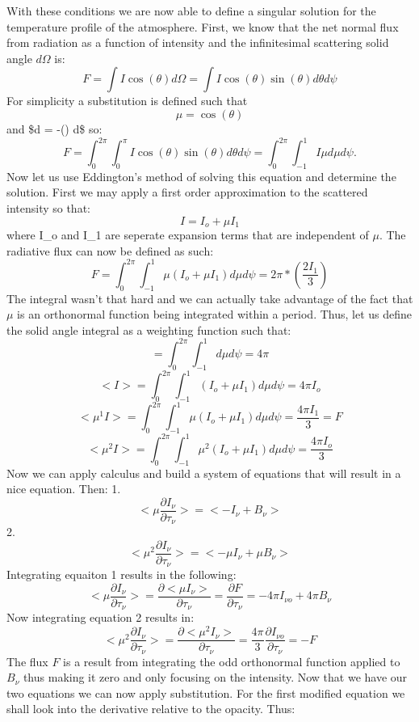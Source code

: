 \documentclass[11pt]{article}
\begin{document}
With these conditions we are now able to define a singular solution for
the temperature profile of the atmosphere. First, we know that the net
normal flux from radiation as a function of intensity and the
infinitesimal scattering solid angle \(d\Omega\) is:
\[F = \int I \cos(\theta) d\Omega= \int I \cos(\theta) \sin(\theta) d\theta d\psi\]
For simplicity a substitution is defined such that
\[\mu = \cos(\theta)\] and \$d \mu = -\sin(\theta) d\theta \$ so:
\[F = \int_{0}^{2\pi} \int_{0}^{\pi} I \cos(\theta) \sin(\theta) d\theta d\psi = \int_{0}^{2\pi} \int_{-1}^{1} I \mu d\mu d\psi.\]
Now let us use Eddington's method of solving this equation and determine
the solution. First we may apply a first order approximation to the
scattered intensity so that: \[I = I_o + \mu I_1\] where I\_o and I\_1
are seperate expansion terms that are independent of \(\mu\). The
radiative flux can now be defined as such:
\[F = \int_{0}^{2\pi} \int_{-1}^{1}  \mu(I_o + \mu I_1 )d\mu d\psi = 2 \pi * (\frac{2 I_1}{3})\]
The integral wasn't that hard and we can actually take advantage of the
fact that \(\mu\) is an orthonormal function being integrated within a
period. Thus, let us define the solid angle integral as a weighting
function such that:
\[<1> = \int_{0}^{2\pi} \int_{-1}^{1} d\mu d\psi = 4 \pi\]
\[<I> = \int_{0}^{2\pi} \int_{-1}^{1} (I_o + \mu I_1 )d\mu d\psi = 4 \pi I_o\]
\[<\mu^1 I> = \int_{0}^{2\pi} \int_{-1}^{1} \mu(I_o + \mu I_1 )d\mu d\psi = \frac{4 \pi I_1}{3}= F\]
\[<\mu^2 I> = \int_{0}^{2\pi} \int_{-1}^{1} \mu^2(I_o + \mu I_1 )d\mu d\psi = \frac{4 \pi I_o}{3}\]
Now we can apply calculus and build a system of equations that will
result in a nice equation. Then: 1.
\[<\mu \frac{\partial I_{\nu}}{\partial \tau_{\nu}}> = <- I_{\nu} + B_{\nu}>\]
2.
\[<\mu^2 \frac{\partial I_{\nu}}{\partial \tau_{\nu}}> = <- \mu I_{\nu} + \mu B_{\nu}>\]
Integrating equaiton 1 results in the following:
\[<\mu \frac{\partial I_{\nu}}{\partial \tau_{\nu}}> = \frac{\partial <\mu I_{\nu}>}{\partial \tau_{\nu}} = \frac{\partial F}{\partial \tau_{\nu}}  = - 4 \pi I_{\nu o} +4\pi B_{\nu}\]
Now integrating equation 2 results in:
\[<\mu^2 \frac{\partial I_{\nu}}{\partial \tau_{\nu}}> = \frac{\partial <\mu^2 I_{\nu}>}{\partial \tau_{\nu}} = \frac{4 \pi}{3}\frac{\partial I_{\nu o}}{\partial \tau_{\nu}}= -F\]
The flux \(F\) is a result from integrating the odd orthonormal function
applied to \(B_{\nu}\) thus making it zero and only focusing on the
intensity. Now that we have our two equations we can now apply
substitution. For the first modified equation we shall look into the
derivative relative to the opacity. Thus:
\end{document}
